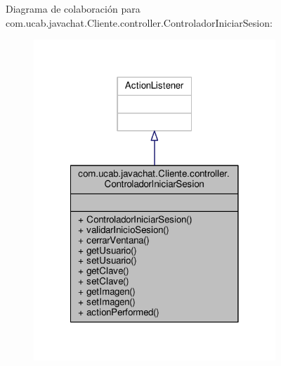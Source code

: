 Diagrama de colaboración para com.\-ucab.\-javachat.\-Cliente.\-controller.\-Controlador\-Iniciar\-Sesion\-:\nopagebreak
\begin{figure}[H]
\begin{center}
\leavevmode
\includegraphics[width=258pt]{classcom_1_1ucab_1_1javachat_1_1_cliente_1_1controller_1_1_controlador_iniciar_sesion__coll__graph}
\end{center}
\end{figure}
